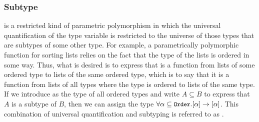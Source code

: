 \subsubsection{Subtype}
 is a restricted kind of parametric polymorphism in which the universal quantification of the type variable is restricted to the universe of those types that are subtypes of some other type. For example, a parametrically polymorphic function for sorting lists relies on the fact that the type of the lists is ordered in some way. Thus, what is desired is to express that  is a function from lists of some ordered type to lists of the same ordered type, which is to say that it is a function from lists of all types where the type is ordered to lists of the same type. If we introduce  as the type of all ordered types and write $A \subseteq B$ to express that $A$ is a subtype of $B$, then we can assign  the type $\forall \alpha \subseteq \text{\text{\small\ttfamily Order}} . [\alpha] \to [\alpha]$. This combination of universal quantification and subtyping is referred to as .
